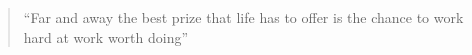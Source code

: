 \documentclass[10pt,a4paper,ragged2e,withhyper]{altacv}
\begin{document}
\begin{paracol}{2}



\nocite{*}  






\switchcolumn


\begin{quote}
``Far and away the best prize that life has to offer is the chance to work hard at work worth doing''
\end{quote}

%





\\

\divider\smallskip


\end{paracol}
\end{document}
